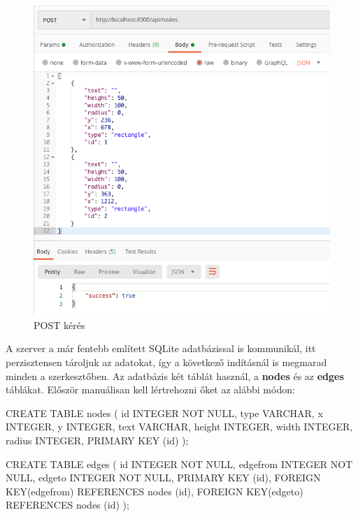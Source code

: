 \begin{figure}[h]
\centering
\includegraphics[scale=0.6]{images/post.png}
\caption{POST kérés}
\label{fig:post}
\end{figure}
 
A szerver a már fentebb említett SQLite adatbázissal is kommunikál, itt perzisztensen tároljuk az adatokat, így a következő indításnál is megmarad minden a szerkesztőben.
Az adatbázis két táblát használ, a \textbf{nodes} és az \textbf{edges} táblákat. Először manuálisan kell lértrehozni őket az alábbi módon:

\begin{SQL}
CREATE TABLE nodes (
        id INTEGER NOT NULL,
        type VARCHAR,
        x INTEGER,
        y INTEGER,
        text VARCHAR,
        height INTEGER,
        width INTEGER,
        radius INTEGER,
        PRIMARY KEY (id)
);

CREATE TABLE edges (
        id INTEGER NOT NULL,
        edgefrom INTEGER NOT NULL,
        edgeto INTEGER NOT NULL,
        PRIMARY KEY (id),
        FOREIGN KEY(edgefrom) REFERENCES nodes (id),
        FOREIGN KEY(edgeto) REFERENCES nodes (id)
);
\end{SQL}